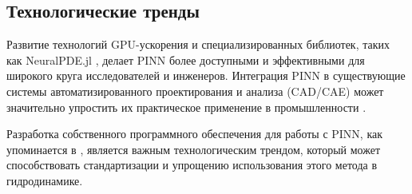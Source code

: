 \subsection{Технологические тренды}
Развитие технологий GPU-ускорения и специализированных библиотек, таких как NeuralPDE.jl \cite{neuralpde2023}, делает PINN
более доступными и эффективными для широкого круга исследователей и инженеров. Интеграция PINN в существующие системы
автоматизированного проектирования и анализа (CAD/CAE) может значительно упростить их практическое применение в
промышленности \cite{cuomo2022scientific}.

Разработка собственного программного обеспечения для работы с PINN, как упоминается в \cite{lu2021deepxde}, является важным
технологическим трендом, который может способствовать стандартизации и упрощению использования этого метода в гидродинамике.




